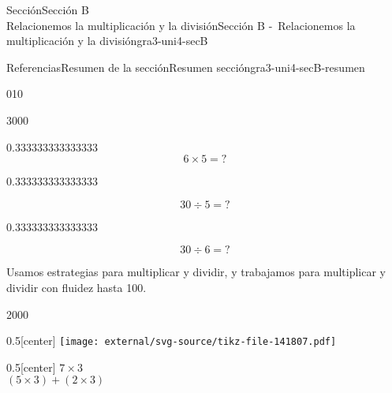 \begin{sectionptx}{Sección}{{\Large Sección B\\}Relacionemos la multiplicación y la división}{}{Sección B -~Relacionemos la multiplicación y la división}{}{}{gra3-uni4-secB}
\begin{references-subsection}{Referencias}{Resumen de la sección}{}{Resumen sección}{}{}{gra3-uni4-secB-resumen}
\begin{image}{0}{1}{0}{}
\end{image}%
\begin{sidebyside}{3}{0}{0}{0}%
\begin{sbspanel}{0.333333333333333}%
%
\begin{equation*}
6\times 5={?}
\end{equation*}
%
\end{sbspanel}%
\begin{sbspanel}{0.333333333333333}%
\par
%
\begin{equation*}
30\div 5={?}
\end{equation*}
%
\end{sbspanel}%
\begin{sbspanel}{0.333333333333333}%
\par
%
\begin{equation*}
30\div 6={?}
\end{equation*}
%
\end{sbspanel}%
\end{sidebyside}%
\par
Usamos estrategias para multiplicar y dividir, y trabajamos para multiplicar y dividir con fluidez hasta 100.%
\begin{sidebyside}{2}{0}{0}{0}%
\begin{sbspanel}{0.5}[center]%
\texttt{[image: external/svg-source/tikz-file-141807.pdf]}
\end{sbspanel}%
\begin{sbspanel}{0.5}[center]%
\(7\times 3\)\\
 \((5\times3)+(2\times3)\)%
\end{sbspanel}%
\end{sidebyside}%
\end{references-subsection}
\end{sectionptx}
%
%
\typeout{************************************************}
\typeout{************************************************}
%
